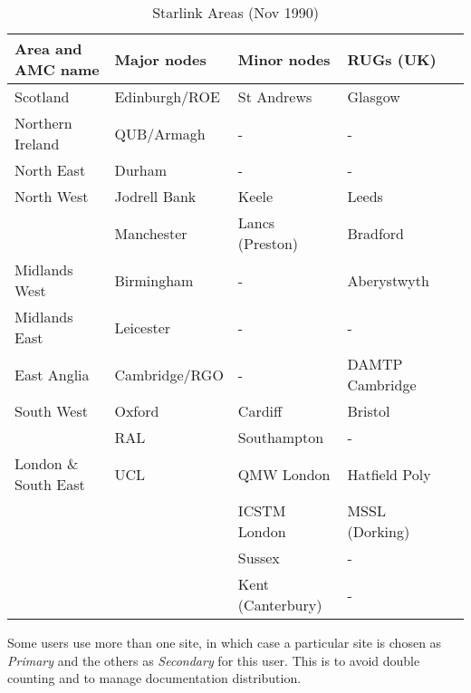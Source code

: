 \begin{table}[htb]
\begin{center}
\begin{tabular}{|l|l|l|l|l|} \hline
{\bf Area and AMC name} & {\bf Major nodes} & {\bf Minor nodes} &
{\bf RUGs (UK)} \\
\hline
\hline
Scotland & Edinburgh/ROE & St Andrews & Glasgow \\
\hline
Northern Ireland & QUB/Armagh & - & - \\
\hline
North East & Durham & - & - \\
\hline
North West & Jodrell Bank & Keele & Leeds \\
& Manchester & Lancs (Preston) & Bradford \\
\hline
Midlands West & Birmingham & - & Aberystwyth \\
\hline
Midlands East & Leicester & - & - \\
\hline
East Anglia & Cambridge/RGO & - & DAMTP Cambridge \\
\hline
South West & Oxford & Cardiff & Bristol \\
& RAL & Southampton & - \\
\hline
London \& South East & UCL & QMW London & Hatfield Poly \\
& & ICSTM London & MSSL (Dorking) \\
& & Sussex & - \\
& & Kent (Canterbury) & - \\
\hline
\end{tabular}
\caption {Starlink Areas (Nov 1990)}
\end{center}
\end{table}

Some users use more than one site, in which case a particular site is chosen as
{\em Primary} and the others as {\em Secondary} for this user.
This is to avoid double counting and to manage documentation distribution.

